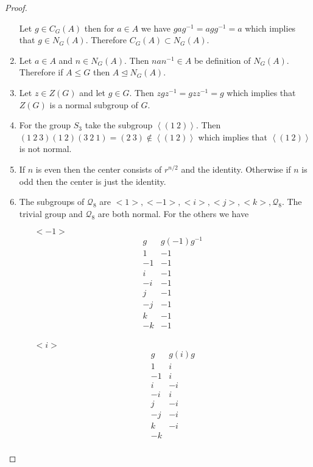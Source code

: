 \documentclass[10pt]{article}
\theoremstyle{plain}
\theoremstyle{remark}
\begin{document}
\begin{proof}
\begin{enumerate}
    Let $g\in C_G(A)$ then for $a\in A$ we have $gag^{-1}=agg^{-1}=a$ which implies that
    $g\in N_G(A)$. Therefore $C_G(A)\subset N_G(A)$.
  \item Let $a\in A$ and $n\in N_G(A)$. Then $nan^{-1}\in A$ be definition of $N_G(A)$. Therefore
    if $A\leq G$ then $A\trianglelefteq N_G(A)$.
  \item Let $z\in Z(G)$ and let $g\in G$. Then $zgz^{-1}=gzz^{-1}=g$ which implies that
    $Z(G)$ is a normal subgroup of $G$.
  \item For the group $S_3$ take the subgroup $\left<(1\ 2)\right>$. Then
    $(1\ 2\ 3)(1\ 2)(3\ 2\ 1)=(2\ 3)\notin \left<(1\ 2)\right>$ which implies that
    $\left<(1\ 2)\right>$ is not normal.
  \item If $n$ is even then the center consists of $r^{n/2}$ and the identity. Otherwise
    if $n$ is odd then the center is just the identity.
  \item The subgroups of $\mathcal{Q}_8$ are $<1>,<-1>,<i>,<j>,<k>,\mathcal{Q}_8$. The
    trivial group and $\mathcal{Q}_8$ are both normal. For the others we have
    \begin{itemize}
    \item[$<-1>$]
      \[
        \begin{array}{c|c}
          g & g(-1)g^{-1}\\
          \hline 
          1 & -1\\
          -1 & -1\\
          i & -1\\
          -i & -1\\
          j & -1\\
          -j & -1\\
          k & -1\\
          -k & -1\\
        \end{array}
      \]
    \item[$<i>$]
      \[
        \begin{array}{c|c}
          g & g(i)g\\
          \hline 
          1 & i\\
          -1 & i\\
          i & -i\\
          -i & i\\
          j & -i\\
          -j & -i\\
          k & -i\\
          -k & \\

\end{array}\]
\end{itemize}
\end{enumerate}
\end{proof}
\end{document}
